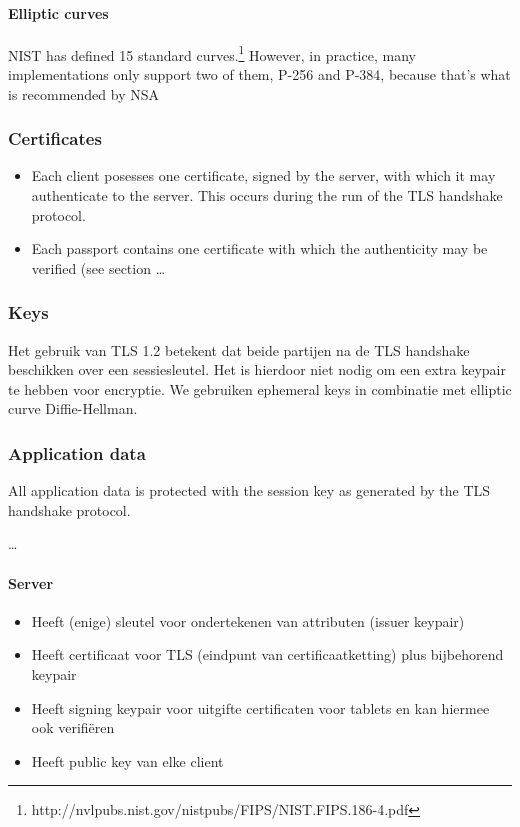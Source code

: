 \paragraph{Elliptic curves}
NIST has defined 15 standard curves.\footnote{http://nvlpubs.nist.gov/nistpubs/FIPS/NIST.FIPS.186-4.pdf} However, in practice, many implementations only support two of them, P-256 and P-384, because that's what is recommended by NSA


\subsubsection{Certificates}
\begin{itemize}
	\item Each client posesses one certificate, signed by the server, with which it may authenticate to the server. This occurs during the run of the TLS handshake protocol.
  \item Each passport contains one certificate with which the authenticity may be verified (see section \ldots
\end{itemize}



\subsubsection{Keys}
Het gebruik van TLS 1.2 betekent dat beide partijen na de TLS handshake beschikken over een sessiesleutel. Het is hierdoor niet nodig om een extra keypair te hebben voor encryptie. We gebruiken ephemeral keys in combinatie met elliptic curve Diffie-Hellman. 

\subsubsection{Application data}
All application data is protected with the session key as generated by the TLS handshake protocol. 

\ldots

\paragraph{Server}
\begin{itemize}
	\item Heeft (enige) sleutel voor ondertekenen van attributen (issuer keypair)
  \item Heeft certificaat voor TLS (eindpunt van certificaatketting) plus bijbehorend keypair
  \item Heeft signing keypair voor uitgifte certificaten voor tablets en kan hiermee ook verifiëren
  \item Heeft public key van elke client
\end{itemize}


